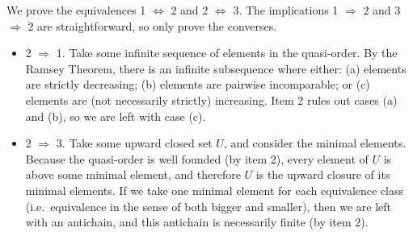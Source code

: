 

{
	We prove the equivalences 1 $\Leftrightarrow$ 2 and 2 $\Leftrightarrow$ 3. The implications 1 $\Rightarrow$ 2 and 3 $\Rightarrow$ 2 are straightforward, so only prove the converses.
	\begin{itemize}
\item 2 $\Rightarrow$ 1. Take some infinite sequence of elements in the quasi-order. By the Ramsey Theorem, there is an infinite subsequence where either: (a) elements are strictly decreasing; (b) elements are pairwise incomparable; or (c) elements are (not necessarily strictly) increasing. Item 2 rules out cases (a) and (b), so we are left with case (c).
\item 2 $\Rightarrow$ 3. Take some upward closed set $U$, and consider the minimal elements. Because the quasi-order is well founded (by item 2), every element of $U$ is above some minimal element, and therefore $U$ is the upward closure of its minimal elements. If we take one minimal element for each equivalence class (i.e.~equivalence in the sense of both bigger and smaller), then we are left with an antichain, and this antichain is necessarily finite (by item 2).
	\end{itemize}
}


